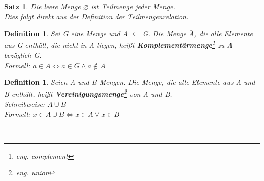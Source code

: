 \documentclass[12pt,german,a4]{article}
\begin{document}
\newtheorem{satz2}[satz]{Satz}
\begin{satz2}
Die leere Menge $\varnothing$ ist Teilmenge jeder Menge.\\
Dies folgt direkt aus der Definition der Teilmengenrelation.
\end{satz2}

\newtheorem{defComplement}[defSet]{Definition}
\begin{defComplement}
Sei G eine Menge und A $\subseteq$ G. Die Menge $\bar{A}$, die alle Elemente aus G enthält, die nicht in A liegen, heißt {\bf Komplementärmenge}\footnote{eng. complement} zu A bezüglich G.\\
Formell: $a \in \bar{A} \Leftrightarrow a \in G \wedge a \not\in A$\\
\end{defComplement}


\newtheorem{defUnion}[defSet]{Definition}
\begin{defUnion}
Seien A und B Mengen. Die Menge, die alle Elemente aus A und B enthält, heißt {\bf Vereinigungsmenge}\footnote{eng. union} von A und B.\\
Schreibweise: $A \cup B$\\
Formell: $x \in A \cup B \Leftrightarrow x \in A \vee x \in B$\\
\end{defUnion}

\\
\end{document}
